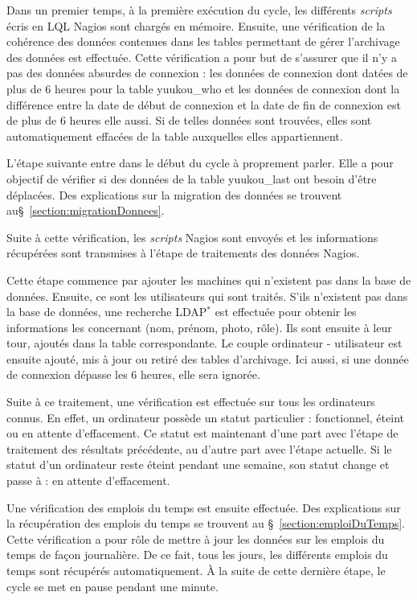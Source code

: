Dans un premier temps, \`a la premi\`ere ex\'ecution du cycle, les diff\'erents \textit{scripts} \'ecris en LQL Nagios sont charg\'es en m\'emoire.
Ensuite, une v\'erification de la coh\'erence des donn\'ees contenues dans les tables permettant de g\'erer l'archivage des donn\'ees est effectu\'ee.
Cette v\'erification a pour but de s'assurer que il n'y a pas des donn\'ees absurdes de connexion : les donn\'ees de connexion dont dat\'ees de plus de 6 heures pour la table \textsf{yuukou\_who} et les donn\'ees de connexion dont la diff\'erence entre la date de d\'ebut de connexion et la date de fin de connexion est de plus de 6 heures elle aussi.
Si de telles donn\'ees sont trouv\'ees, elles sont automatiquement effac\'ees de la table auxquelles elles appartiennent.

L'\'etape suivante entre dans le d\'ebut du cycle \`a proprement parler.
Elle a pour objectif de v\'erifier si des donn\'ees de la table \textsf{yuukou\_last} ont besoin d'\^etre d\'eplac\'ees.
Des explications sur la migration des donn\'ees se trouvent au\S~\ref{section:migrationDonnees}.

Suite \`a cette v\'erification, les \textit{scripts} Nagios sont envoy\'es et les informations r\'ecup\'er\'ees sont transmises \`a l'\'etape de traitements des donn\'ees Nagios.

Cette \'etape commence par ajouter les machines qui n'existent pas dans la base de donn\'ees.
Ensuite, ce sont les utilisateurs qui sont trait\'es.
S'ils n'existent pas dans la base de donn\'ees, une recherche LDAP$^*$ est effectu\'ee pour obtenir les informations les concernant (nom, pr\'enom, photo, r\^ole).
Ils sont ensuite \`a leur tour, ajout\'es dans la table correspondante.
Le couple ordinateur - utilisateur est ensuite ajout\'e, mis \`a jour ou retir\'e des tables d'archivage.
Ici aussi, si une donn\'ee de connexion d\'epasse les 6 heures, elle sera ignor\'ee.

Suite \`a ce traitement, une v\'erification est effectu\'ee sur tous les ordinateurs connus.
En effet, un ordinateur poss\`ede un statut particulier : fonctionnel, \'eteint ou en attente d'effacement.
Ce statut est maintenant d'une part avec l'\'etape de traitement des r\'esultats pr\'ec\'edente, au d'autre part avec l'\'etape actuelle.
Si le statut d'un ordinateur reste \'eteint pendant une semaine, son statut change et passe \`a : en attente d'effacement.

Une v\'erification des emplois du temps est ensuite effectu\'ee.
Des explications sur la r\'ecup\'eration des emplois du temps se trouvent au \S~\ref{section:emploiDuTemps}.
Cette v\'erification a pour r\^ole de mettre \`a jour les donn\'ees sur les emplois du temps de fa\c{c}on journali\`ere.
De ce fait, tous les jours, les diff\'erents emplois du temps sont r\'ecup\'er\'es automatiquement.
\`A la suite de cette derni\`ere \'etape, le cycle se met en pause pendant une minute.

